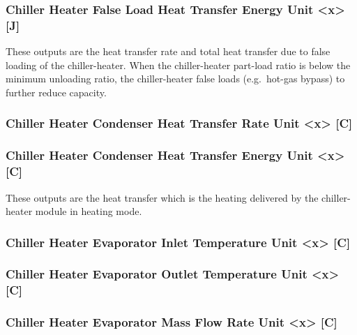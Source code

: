\subsubsection{Chiller Heater False Load Heat Transfer Energy Unit \textless{}x\textgreater{} {[}J{]}}\label{chiller-heater-false-load-heat-transfer-energy-unit-x-j}

These outputs are the heat transfer rate and total heat transfer due to false loading of the chiller-heater. When the chiller-heater part-load ratio is below the minimum unloading ratio, the chiller-heater false loads (e.g.~hot-gas bypass) to further reduce capacity.

\subsubsection{Chiller Heater Condenser Heat Transfer Rate Unit \textless{}x\textgreater{} {[}C{]}}\label{chiller-heater-condenser-heat-transfer-rate-unit-x-c}

\subsubsection{Chiller Heater Condenser Heat Transfer Energy Unit \textless{}x\textgreater{} {[}C{]}}\label{chiller-heater-condenser-heat-transfer-energy-unit-x-c}

These outputs are the heat transfer which is the heating delivered by the chiller-heater module in heating mode.

\subsubsection{Chiller Heater Evaporator Inlet Temperature Unit \textless{}x\textgreater{} {[}C{]}}\label{chiller-heater-evaporator-inlet-temperature-unit-x-c}

\subsubsection{Chiller Heater Evaporator Outlet Temperature Unit \textless{}x\textgreater{} {[}C{]}}\label{chiller-heater-evaporator-outlet-temperature-unit-x-c}

\subsubsection{Chiller Heater Evaporator Mass Flow Rate Unit \textless{}x\textgreater{} {[}C{]}}\label{chiller-heater-evaporator-mass-flow-rate-unit-x-c}

